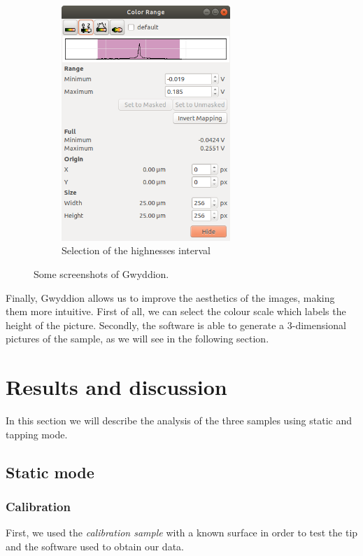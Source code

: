 \documentclass[11pt,a4paper]{article}
\begin{document}
\begin{figure}[ht]
\begin{subfigure}[b]{0.45\textwidth}
\includegraphics[width=0.7\textwidth]{scale_selection}
\caption{Selection of the highnesses interval}
\label{fig:scale_selection}
\end{subfigure}
\caption{Some screenshots of Gwyddion.}
\label{fig:gwyddion}
\end{figure}

Finally, Gwyddion allows us to improve the aesthetics of the images, making them more intuitive. First of all, we can select the colour scale which labels the height of the picture. Secondly, the software is able to generate a 3-dimensional pictures of the sample, as we will see in the following section.

\section{Results and discussion}
In this section we will describe the analysis of the three samples using static and tapping mode. 

\subsection{Static mode}
\subsubsection{Calibration}
First, we used the \emph{calibration sample} with a known surface in order to test the tip and the software used to obtain our data. 
\end{document}
